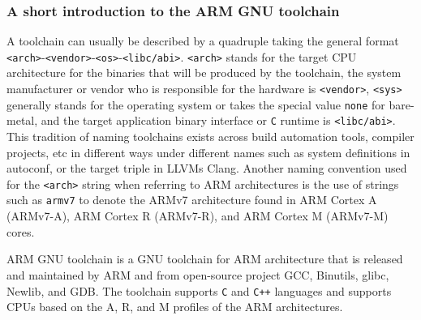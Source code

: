\begin{figure}[H]
	\centering
\end{figure}

\subsubsection{A short introduction to the ARM GNU toolchain}

A toolchain can usually be described by a quadruple taking the general format \texttt{<arch>}-\texttt{<vendor>}-\texttt{<os>}-\texttt{<libc/abi>}. \texttt{<arch>} stands for the target CPU architecture for the binaries that will be produced by the toolchain, the system manufacturer or vendor who is responsible for the hardware is \texttt{<vendor>}, \texttt{<sys>} generally stands for the operating system or takes the special value \texttt{none} for bare-metal, and the target application binary interface or \texttt{C} runtime is \texttt{<libc/abi>}. This tradition of naming toolchains exists across build automation tools, compiler projects, etc in different ways under different names such as system definitions in autoconf, or the target triple in LLVM\textquotesingle s Clang. Another naming convention used for the \texttt{<arch>} string when referring to ARM architectures is the use of strings such as \texttt{armv7} to denote the ARMv7 architecture found in ARM Cortex A (ARMv7-A), ARM Cortex R (ARMv7-R), and ARM Cortex M (ARMv7-M) cores.

ARM GNU toolchain is a GNU toolchain for ARM architecture that is released and maintained by ARM and from open-source project GCC, Binutils, glibc, Newlib, and GDB. The toolchain supports \texttt{C} and \texttt{C++} languages and supports CPUs based on the A, R, and M profiles of the ARM architectures.

